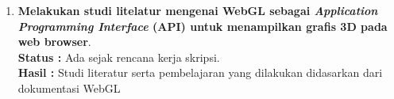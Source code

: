 \documentclass[a4paper,twoside]{article}
\begin{document}
\begin{enumerate}
\begin{enumerate}
\begin{itemize}
                    \item Sendi\\
                    Terdapat dua tipe persendian uatama antar tulang belakang, yaitu \textit{syshisis} dan sendi synovialis. Setiap ruas setidaknya memiliki 6 sendi diantara ruas lainnya. 
                \end{itemize}
                
                 \item \textit{Pectorales}/Dada \\
                 \textit{Cavitas thoracis} adalah rongga pada dada dengan ukuran tidak beraturan. Rongga ini berfungsi untuk mewadahi dan melindungi jantung, paru serta pembuluh besar,  
                
            \end{enumerate}


        
             \item \textbf{Melakukan studi litelatur mengenai WebGL sebagai \textit{Application Programming Interface} (API) untuk menampilkan grafis 3D pada web browser}.\\
             {\bf Status :} Ada sejak rencana kerja skripsi.\\
             {\bf Hasil :} Studi literatur serta pembelajaran yang dilakukan didasarkan dari dokumentasi WebGL


\end{enumerate}
\end{document}

